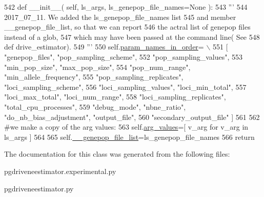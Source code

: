 \begin{DoxyCode}
542     \textcolor{keyword}{def }\_\_init\_\_( self, ls\_args, ls\_genepop\_file\_names=None ):
543         \textcolor{stringliteral}{'''}
544 \textcolor{stringliteral}{        2017\_07\_11.  We added the ls\_genepop\_file\_names list}
545 \textcolor{stringliteral}{        and member \_\_genepop\_file\_list, so that we can report}
546 \textcolor{stringliteral}{        the actral list of genepop files instead of a glob,}
547 \textcolor{stringliteral}{        which may have been passed at the command line( See }
548 \textcolor{stringliteral}{        def drive\_estimator).}
549 \textcolor{stringliteral}{        '''}
550         self.\hyperlink{classnegui_1_1pgdriveneestimator_1_1ArgSet_a0cdcbc98348d7b15a824518b1e1f61c1}{param\_names\_in\_order}= \(\backslash\)
551                 [ \textcolor{stringliteral}{"genepop\_files"}, \textcolor{stringliteral}{"pop\_sampling\_scheme"},
552                         \textcolor{stringliteral}{"pop\_sampling\_values"},
553                         \textcolor{stringliteral}{"min\_pop\_size"}, \textcolor{stringliteral}{"max\_pop\_size"},
554                         \textcolor{stringliteral}{"pop\_num\_range"}, \textcolor{stringliteral}{"min\_allele\_frequency"},
555                         \textcolor{stringliteral}{"pop\_sampling\_replicates"}, \textcolor{stringliteral}{"loci\_sampling\_scheme"},
556                         \textcolor{stringliteral}{"loci\_sampling\_values"}, \textcolor{stringliteral}{"loci\_min\_total"},
557                         \textcolor{stringliteral}{"loci\_max\_total"}, \textcolor{stringliteral}{"loci\_num\_range"}, 
558                         \textcolor{stringliteral}{"loci\_sampling\_replicates"}, \textcolor{stringliteral}{"total\_cpu\_processes"},
559                         \textcolor{stringliteral}{"debug\_mode"}, \textcolor{stringliteral}{"nbne\_ratio"}, \textcolor{stringliteral}{"do\_nb\_bias\_adjustment"}, \textcolor{stringliteral}{"output\_file"},
560                         \textcolor{stringliteral}{"secondary\_output\_file"} ]
561         
562         \textcolor{comment}{#we make a copy of the arg values:}
563         self.\hyperlink{classnegui_1_1pgdriveneestimator_1_1ArgSet_a2e3b4f2876009bac711cac73863ffd18}{arg\_values}=[ v\_arg \textcolor{keywordflow}{for} v\_arg \textcolor{keywordflow}{in} ls\_args ]
564 
565         self.\hyperlink{classnegui_1_1pgdriveneestimator_1_1ArgSet_aed45ec07079b9956642aa1fc7269e8b9}{\_\_genepop\_file\_list}=ls\_genepop\_file\_names
566         \textcolor{keywordflow}{return}
\end{DoxyCode}


The documentation for this class was generated from the following files\+:\begin{DoxyCompactItemize}
\item 
pgdriveneestimator.\+experimental.\+py\item 
pgdriveneestimator.\+py\end{DoxyCompactItemize}
